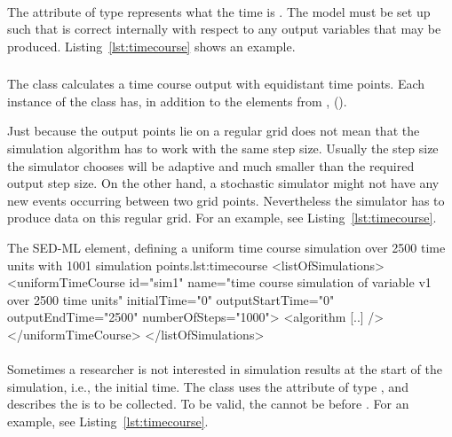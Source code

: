 \paragraph*{}
\label{sec:initialTime}
The attribute  of type  represents what the time is .  The model must be set up such that  is correct internally with respect to any output variables that may be produced.
Listing~\ref{lst:timecourse} shows an example. 



\subsubsection{}
\label{class:uniformTimeCourse}
The \UniformTimeCourse class calculates a time course output with equidistant time points. Each instance of the \UniformTimeCourse class has, in addition to the elements from  \hyperref[sec:outputStartTime]{},  ().

Just because the output points lie on a regular grid does not mean that the simulation algorithm has to work with the same step size. Usually the step size the simulator chooses will be adaptive and much smaller than the required output step size. On the other hand, a stochastic simulator might not have any new events occurring between two grid points. Nevertheless the simulator has to produce data on this regular grid. For an example, see Listing~\ref{lst:timecourse}.

\begin{myXmlLst}{The SED-ML  element, defining a uniform time course simulation over 2500 time units with 1001 simulation points.}{lst:timecourse}
<listOfSimulations>
	<uniformTimeCourse id="sim1"  name="time course simulation of variable v1 over 2500 time units"  
		initialTime="0" outputStartTime="0" outputEndTime="2500" numberOfSteps="1000">
		<algorithm [..] />
 	</uniformTimeCourse>
</listOfSimulations>
\end{myXmlLst}

\paragraph*{}
\label{sec:outputStartTime}
Sometimes a researcher is not interested in simulation results at the start of the simulation, i.e., the initial time. The \UniformTimeCourse class uses the attribute  of type , and describes the  is to be collected. To be valid, the  cannot be before \hyperref[sec:initialTime]{}. For an example, see Listing~\ref{lst:timecourse}. 

